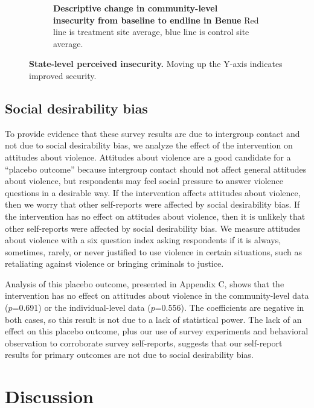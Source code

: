 \documentclass[11pt]{article}
\begin{document}
\begin{figure}[H]
\begin{subfigure}[b]{.48\textwidth}
        \caption{\textbf{Descriptive change in community-level insecurity from baseline to endline in Benue} Red line is treatment site average, blue line is control site average.}
        \label{fig:in_ben}
    \end{subfigure}
    \caption{\textbf{State-level perceived insecurity.}  Moving up the Y-axis indicates improved security.}
\end{figure}

\hypertarget{social-desirability-bias}{%
\subsection{Social desirability bias}\label{social-desirability-bias}}

To provide evidence that these survey results are due to intergroup
contact and not due to social desirability bias, we analyze the effect
of the intervention on attitudes about violence. Attitudes about
violence are a good candidate for a ``placebo outcome'' because
intergroup contact should not affect general attitudes about violence,
but respondents may feel social pressure to answer violence questions in
a desirable way. If the intervention affects attitudes about violence,
then we worry that other self-reports were affected by social
desirability bias. If the intervention has no effect on attitudes about
violence, then it is unlikely that other self-reports were affected by
social desirability bias. We measure attitudes about violence with a six
question index asking respondents if it is always, sometimes, rarely, or
never justified to use violence in certain situations, such as
retaliating against violence or bringing criminals to justice.

Analysis of this placebo outcome, presented in Appendix C, shows that
the intervention has no effect on attitudes about violence in the
community-level data (\(p\)=0.691) or the individual-level data
(\(p\)=0.556). The coefficients are negative in both cases, so this
result is not due to a lack of statistical power. The lack of an effect
on this placebo outcome, plus our use of survey experiments and
behavioral observation to corroborate survey self-reports, suggests that
our self-report results for primary outcomes are not due to social
desirability bias.

\hypertarget{discussion}{%
\section{Discussion}\label{discussion}}
\end{document}

